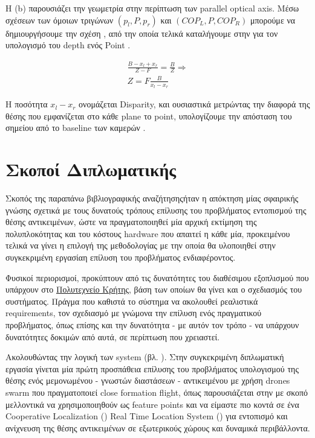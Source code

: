 Η  (b) παρουσιάζει την γεωμετρία στην περίπτωση των parallel optical axis. Μέσω σχέσεων των όμοιων τριγώνων $(p_l, P, p_r)$ και $(COP_L, P, COP_R)$ μπορούμε να δημιουργήσουμε την σχέση , από την οποία τελικά καταλήγουμε στην  για τον υπολογισμό του depth ενός Point \cite{introduction-to-computer-vision}. 

\begin{gather}
	\frac{B-x_l+x_r}{Z-F} = \frac{B}{Z} \Rightarrow \label{eq:stereo-basic-eq} \\
	Z = F \frac{B}{x_l - x_r} \label{eq:stereo-depth-est}
\end{gather}

Η ποσότητα $x_l - x_r$ ονομάζεται Disparity, και ουσιαστικά μετρώντας την διαφορά της θέσης που εμφανίζεται στο κάθε plane το point, υπολογίζουμε την απόσταση του σημείου από το baseline των καμερών \cite{introduction-to-computer-vision}.

\section{Σκοποί Διπλωματικής} \label{chap:thesis-approach} %
Σκοπός της παραπάνω βιβλιογραφικής αναζήτησης\udot ήταν η απόκτηση μίας σφαιρικής γνώσης σχετικά με τους δυνατούς τρόπους επίλυσης του προβλήματος εντοπισμού της θέσης αντικειμένων, ώστε να πραγματοποιηθεί μία αρχική εκτίμηση της πολυπλοκότητας και του κόστους hardware που απαιτεί η κάθε μία, προκειμένου τελικά να γίνει η επιλογή της μεθοδολογίας με την οποία θα υλοποιηθεί στην συγκεκριμένη εργασία\udot η επίλυση του προβλήματος ενδιαφέροντος.

Φυσικοί περιορισμοί, προκύπτουν από τις δυνατότητες του διαθέσιμου εξοπλισμού που υπάρχουν στο \href{https://www.tuc.gr/}{Πολυτεχνείο Κρήτης}, βάση των οποίων θα γίνει και ο σχεδιασμός του συστήματος. Πράγμα που καθιστά το σύστημα να ακολουθεί ρεα\-λι\-στι\-κά requirements, τον σχεδιασμό με γνώμονα την επίλυση ενός πραγματικού προ\-βλή\-ματος, όπως επίσης και την δυνατότητα - με αυτόν τον τρόπο - να υπάρχουν δυνατότητες δοκιμών από αυτά, σε περίπτωση που χρειαστεί. 

Ακολουθώντας την λογική των  system (βλ. ). Στην συγκεκριμένη διπλωματική εργασία γίνεται μία πρώτη προσπάθεια επίλυσης του προ\-βλή\-μα\-τος υπολογισμού της θέσης ενός μεμονωμένου - γνωστών διαστάσεων - α\-ντι\-κει\-μένου με
χρήση drones swarm που πραγματοποιεί close formation flight, όπως παρουσιάζεται στην  με σκοπό μελλοντικά να
χρησιμοποιηθούν ως feature points και να είμαστε πιο κοντά σε ένα Cooperative Localization () Real Time Location System () για εντοπισμό και ανίχνευση της θέσης αντικειμένων σε εξωτερικούς χώρους και δυναμικά περιβάλλοντα.

